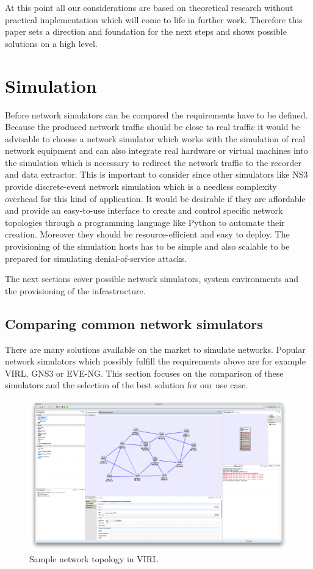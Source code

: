 \documentclass[conference]{IEEEtran}
\begin{document}
At this point all our considerations are based on theoretical research  without practical implementation which will come to life in further work. Therefore this paper sets a direction and foundation for the next steps and shows possible solutions on a high level.

\section{Simulation}

Before network simulators can be compared the requirements have to be defined. Because the produced network traffic should be close to real traffic it would be advisable to choose a network simulator which works with the simulation of real network equipment and can also integrate real hardware or virtual machines into the simulation which is necessary to redirect the network traffic to the recorder and data extractor. This is important to consider since other simulators like NS3 provide discrete-event network simulation which is a needless complexity overhead for this kind of application. It would be desirable if they are affordable and provide an easy-to-use interface to create and control specific network topologies through a programming language like Python to automate their creation. Moreover they should be resource-efficient and easy to deploy. The provisioning of the simulation hosts has to be simple and also scalable to be prepared for simulating denial-of-service attacks.

The next sections cover possible network simulators, system environments and the provisioning of the infrastructure.

\subsection{Comparing common network simulators}
There are many solutions available on the market to simulate networks. Popular network simulators which possibly fulfill the requirements above are for example VIRL, GNS3 or EVE-NG. This section focuses on the comparison of these simulators and the selection of the best solution for our use case.  \cite{b1}

\begin{figure}[htbp]
\centerline{\includegraphics[scale=0.55]{virl.png}}
\caption{Sample network topology in VIRL \cite{b2}}
\label{virl}
\end{figure}
\end{document}
